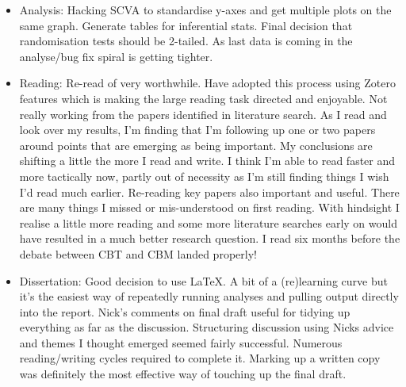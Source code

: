 \documentclass[british]{article}
\begin{document}
\begin{itemize}
  \item Analysis: Hacking SCVA to standardise y-axes and get multiple
  plots on the same graph. Generate tables for inferential stats. Final
  decision that randomisation tests should be 2-tailed. As last data is coming
  in the analyse/bug fix spiral is getting tighter.

  \item Reading: Re-read of \textcite{shon_how_2012} very worthwhile. Have
  adopted this process using Zotero features which is making the large
  reading task directed and enjoyable. Not really working from the papers
  identified in literature search. As I read and look over my results,
  I'm finding that I'm following up one or two papers around points that
  are emerging as being important. My conclusions are shifting a little
  the more I read and write. I think I'm able to read faster and more
  tactically now, partly out of necessity as I'm still finding things
  I wish I'd read much earlier.  Re-reading key papers also important
  and useful. There are many things I missed or mis-understood on first
  reading. With hindsight I realise a little more reading and some more
  literature searches early on would have resulted in a much better
  research question. I read \textcite{cristea_efficacy_2015} six months
  before the debate between CBT and CBM landed properly!

  \item Dissertation: Good decision to use LaTeX. A bit of a (re)learning
  curve but it's the easiest way of repeatedly running analyses and
  pulling output directly into the report. Nick's comments on final draft
  useful for tidying up everything as far as the discussion. Structuring
  discussion using Nicks advice and themes I thought emerged seemed
  fairly successful.  Numerous reading/writing cycles required to complete
  it. Marking up a written copy was definitely the most effective way
  of touching up the final draft.
\end{itemize}

\printbibliography
\end{document}
